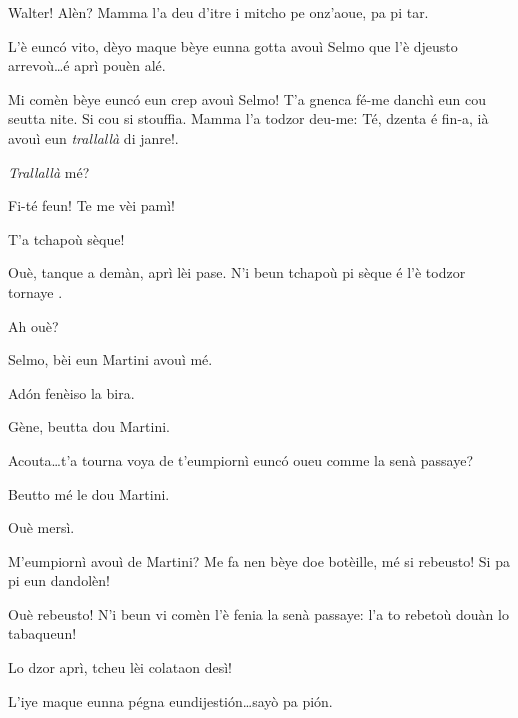 \begin{drama}

\Gemmaspeaks Walter! Alèn? Mamma l'a deu d'itre i mitcho pe onz'aoue, pa pi tar.

\Walterspeaks	L'è eunc\'o vito, dèyo maque  bèye eunna gotta avouì Selmo que l'è djeusto arrevoù\ldots é aprì pouèn alé.

\Gemmaspeaks{} Mi comèn bèye eunc\'o eun crep avouì Selmo! T'a gnenca fé-me danchì eun cou seutta nite. Si cou si stouffia. Mamma l'a todzor deu-me: \og Té, dzenta é fin-a, ià avouì eun \textit{trallallà} di janre!\fg.

\Walterspeaks	\textit{Trallallà} mé?

\Gemmaspeaks Fi-té feun! Te me vèi pamì! 


\Selmospeaks{} T'a tchapoù sèque!

\Walterspeaks	Ouè, tanque a demàn, aprì lèi pase. N'i beun tchapoù pi sèque é l'è todzor tornaye	.

\Selmospeaks Ah ouè?

\Walterspeaks{} Selmo, bèi eun Martini avouì mé.

\Selmospeaks Ad\'on fenèiso la bira.

\Walterspeaks Gène, beutta dou Martini.

\Genespeaks Acouta\ldots t'a tourna voya de t'eumpiornì eunc\'o oueu comme la senà passaye?

\Dorinaspeaks Beutto mé le dou Martini.

\Genespeaks{} Ouè mersì.

\Walterspeaks	M'eumpiornì avouì de Martini? Me fa nen bèye doe botèille, mé si rebeusto! Si pa pi eun dandolèn!

\Genespeaks{} Ouè rebeusto! N'i beun vi comèn l'è fenia la senà passaye: l'a to rebetoù douàn lo tabaqueun!


\Genespeaks Lo dzor aprì, tcheu lèi colataon desì!

\Walterspeaks L'iye maque eunna pégna eundijesti\'on\ldots sayò pa pi\'on.



\end{drama}
